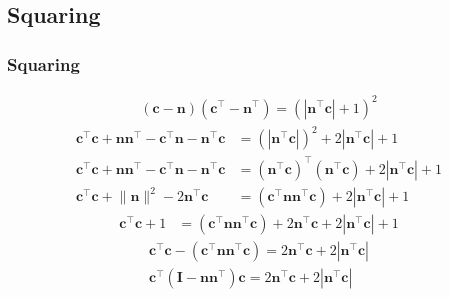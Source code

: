 \documentclass{beamer}
\providecommand{\brak}[1]{\ensuremath{\left(#1\right)}}
\theoremstyle{remark}
\providecommand{\norm}[1]{\lVert#1\rVert}
\let\vec\mathbf
\numberwithin{equation}{section}
\begin{document}
\subsection{Squaring}
\begin{frame}
\frametitle{Squaring}
\begin{align}
\brak{\vec{c}-\vec{n}}\brak{\vec{c}^\top-\vec{n}^\top}=\brak{|\vec{n}^\top\vec{c}|+1}^2 
\end{align}
\begin{align}
\vec{c}^\top\vec{c}+\vec{n}\vec{n}^\top-\vec{c}^\top\vec{n}-\vec{n}^\top\vec{c}&= \brak{|\vec{n}^\top\vec{c}|}^2+2|\vec{n}^\top\vec{c}|+1\\
\vec{c}^\top\vec{c}+\vec{n}\vec{n}^\top-\vec{c}^\top\vec{n}-\vec{n}^\top\vec{c}&=\brak{\vec{n}^\top\vec{c}}^\top\brak{\vec{n}^\top\vec{c}}+2|\vec{n}^\top\vec{c}|+1\\
\vec{c}^\top\vec{c}+\norm{\vec{n}}^2-2\vec{n}^\top\vec{c}&=\brak{\vec{c}^\top\vec{n}\vec{n}^\top\vec{c}}+2|\vec{n}^\top\vec{c}|+1 
\end{align}
\begin{align}
\vec{c}^\top\vec{c}+1&=\brak{\vec{c}^\top\vec{n}\vec{n}^\top\vec{c}}+2\vec{n}^\top\vec{c}+2|\vec{n}^\top\vec{c}|+1 
\end{align}
\begin{align}
\vec{c}^\top\vec{c}-\brak{\vec{c}^\top\vec{n}\vec{n}^\top\vec{c}}=2\vec{n}^\top\vec{c}+2|\vec{n}^\top\vec{c}| \\
\vec{c}^\top\brak{\vec{I}-\vec{n}\vec{n}^\top}\vec{c}=2\vec{n}^\top\vec{c}+2|\vec{n}^\top\vec{c}| 
\end{align}
\end{frame}
\end{document}
